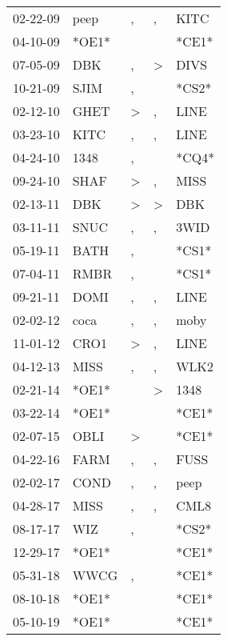 \begin{supertabular}{lllll}
 02-22-09 &   peep &             , &             , &   KITC \\
 04-10-09 &  *OE1* &               &               &  *CE1* \\
 07-05-09 &    DBK &             , &  \textgreater &   DIVS \\
 10-21-09 &   SJIM &             , &               &  *CS2* \\
 02-12-10 &   GHET &  \textgreater &             , &   LINE \\
 03-23-10 &   KITC &             , &             , &   LINE \\
 04-24-10 &   1348 &             , &               &  *CQ4* \\
 09-24-10 &   SHAF &  \textgreater &             , &   MISS \\
 02-13-11 &    DBK &  \textgreater &  \textgreater &    DBK \\
 03-11-11 &   SNUC &             , &             , &   3WID \\
 05-19-11 &   BATH &             , &               &  *CS1* \\
 07-04-11 &   RMBR &             , &               &  *CS1* \\
 09-21-11 &   DOMI &             , &             , &   LINE \\
 02-02-12 &   coca &             , &             , &   moby \\
 11-01-12 &   CRO1 &  \textgreater &             , &   LINE \\
 04-12-13 &   MISS &             , &             , &   WLK2 \\
 02-21-14 &  *OE1* &               &  \textgreater &   1348 \\
 03-22-14 &  *OE1* &               &               &  *CE1* \\
 02-07-15 &   OBLI &  \textgreater &               &  *CE1* \\
 04-22-16 &   FARM &             , &             , &   FUSS \\
 02-02-17 &   COND &             , &             , &   peep \\
 04-28-17 &   MISS &             , &             , &   CML8 \\
 08-17-17 &    WIZ &             , &               &  *CS2* \\
 12-29-17 &  *OE1* &               &               &  *CE1* \\
 05-31-18 &   WWCG &             , &               &  *CE1* \\
 08-10-18 &  *OE1* &               &               &  *CE1* \\
 05-10-19 &  *OE1* &               &               &  *CE1* \\
\end{supertabular}
